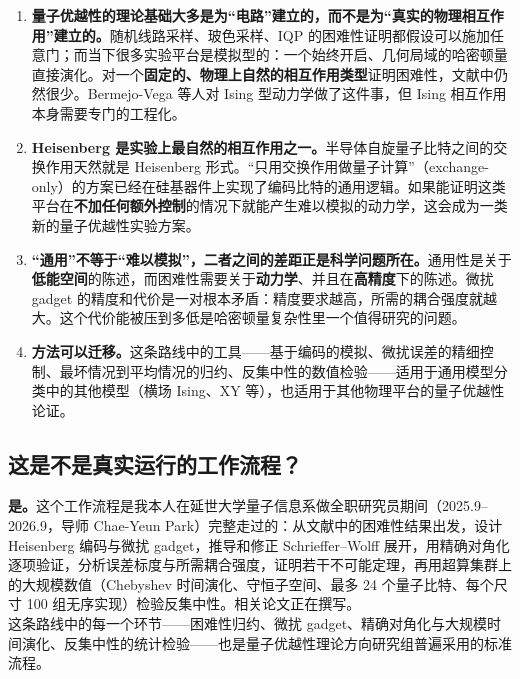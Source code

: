 \documentclass[11pt,a4paper,fontset=none]{ctexart}
\begin{document}
\begin{enumerate}[label=\arabic*.,leftmargin=1.5em]
  \item \textbf{量子优越性的理论基础大多是为“电路”建立的，而不是为“真实的物理相互作用”建立的。}随机线路采样、玻色采样、IQP 的困难性证明都假设可以施加任意门；而当下很多实验平台是模拟型的：一个始终开启、几何局域的哈密顿量直接演化。对一个\textbf{固定的、物理上自然的相互作用类型}证明困难性，文献中仍然很少。Bermejo-Vega 等人对 Ising 型动力学做了这件事\cite{BV2018}，但 Ising 相互作用本身需要专门的工程化。

  \item \textbf{Heisenberg 是实验上最自然的相互作用之一。}半导体自旋量子比特之间的交换作用天然就是 Heisenberg 形式。“只用交换作用做量子计算”（exchange-only）的方案\cite{DiVincenzo2000}已经在硅基器件上实现了编码比特的通用逻辑\cite{Weinstein2023}。如果能证明这类平台在\textbf{不加任何额外控制}的情况下就能产生难以模拟的动力学，这会成为一类新的量子优越性实验方案。

  \item \textbf{“通用”不等于“难以模拟”，二者之间的差距正是科学问题所在。}通用性是关于\textbf{低能空间}的陈述，而困难性需要关于\textbf{动力学}、并且在\textbf{高精度}下的陈述。微扰 gadget 的精度和代价是一对根本矛盾：精度要求越高，所需的耦合强度就越大。这个代价能被压到多低是哈密顿量复杂性里一个值得研究的问题。

  \item \textbf{方法可以迁移。}这条路线中的工具——基于编码的模拟、微扰误差的精细控制、最坏情况到平均情况的归约\cite{Quek2025}、反集中性的数值检验\cite{Hangleiter2018}——适用于通用模型分类中的其他模型（横场 Ising、XY 等），也适用于其他物理平台的量子优越性论证。
\end{enumerate}

\subsection{这是不是真实运行的工作流程？}

\noindent \textbf{是。}这个工作流程是我本人在延世大学量子信息系做全职研究员期间（2025.9–2026.9，导师 Chae-Yeun Park）完整走过的：从文献中的困难性结果出发，设计 Heisenberg 编码与微扰 gadget，推导和修正 Schrieffer–Wolff 展开，用精确对角化逐项验证，分析误差标度与所需耦合强度，证明若干不可能定理，再用超算集群上的大规模数值（Chebyshev 时间演化、守恒子空间、最多 24 个量子比特、每个尺寸 100 组无序实现）检验反集中性。相关论文正在撰写。\\

\noindent 这条路线中的每一个环节——困难性归约、微扰 gadget、精确对角化与大规模时间演化、反集中性的统计检验——也是量子优越性理论方向研究组普遍采用的标准流程\cite{BV2018,Hangleiter2018,Quek2025}。
\end{document}
